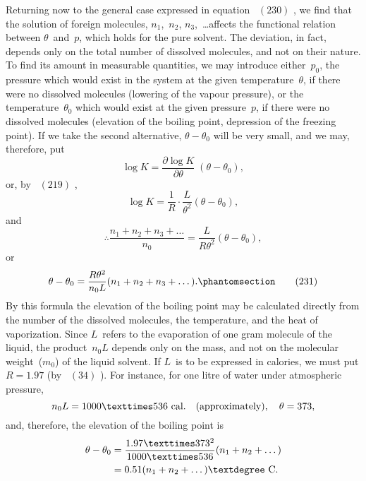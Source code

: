\documentclass[12pt]{book}[2005/09/16]
\newcommand{\Chg}[2]{#2}
\newcommand{\Add}[1]{\Chg{}{#1}}
\newcommand{\Tag}[1]{%
  \phantomsection\label{eqn:#1}\tag*{\ensuremath{#1}}%
}
\newcommand{\Eq}[1]{%
  \hyperref[eqn:#1]{\ensuremath{#1}}%
}
\newcommand{\PageSep}[1]{\ignorespaces}
\newcommand{\dd}{\partial}
\newcommand{\Unit}[1]{\text{\upshape #1}}
\begin{document}
Returning now to the general case expressed in equation~\Eq{(230)},
we find that the solution of foreign molecules,
$n_{1}$,~$n_{2}$, $n_{3}$,~\dots affects the functional relation between $\theta$~and~$p$,
which holds for the pure solvent. The deviation, in fact,
depends only on the total number of dissolved molecules,
and not on their nature. To find its amount in measurable
quantities, we may introduce either~$p_{0}$, the pressure which
would exist in the system at the given temperature~$\theta$, if
there were no dissolved molecules (lowering of the vapour
pressure), or the temperature~$\theta_{0}$ which would exist at the
given pressure~$p$, if there were no dissolved molecules
(elevation of the boiling point, depression of the freezing
point). If we take the second alternative, $\theta - \theta_{0}$ will be
very small, and we may, therefore, put
\[
\log K = \frac{\dd \log K}{\dd \theta}\; (\theta - \theta_{0}),
\]
or, by~\Eq{(219)},
\[
\log K = \frac{1}{R} · \frac{L}{\theta^{2}} (\theta - \theta_{0}),
\]
and
\[
\therefore
\frac{n_{1} + n_{2} + n_{3} + \dots}{n_{0}}
  = \frac{L}{R\theta^{2}} (\theta - \theta_{0}),
\]
or
\[
\theta - \theta_{0} = \frac{R\theta^{2}}{n_{0} L} (n_{1} + n_{2} + n_{3} + \dots)\Add{.}
\Tag{(231)}
\]
By this formula the elevation of the boiling point may
be calculated directly from the number of the dissolved
molecules, the temperature, and the heat of vaporization.
\PageSep{248}
Since $L$~refers to the evaporation of one gram molecule of the
liquid, the product~$n_{0} L$ depends only on the mass, and not
on the molecular weight~($m_{0}$) of the liquid solvent. If $L$~is
to be expressed in calories, we must put $R = 1.97$ (by~\Chg{34}{\Eq{(34)}}).
For instance, for one litre of water under atmospheric
pressure,
\[
n_{0} L = 1000 × 536~\Unit{cal.}\quad\text{(approximately)},\quad
\theta = 373,
\]
and, therefore, the elevation of the boiling point is
\begin{align*}
\theta - \theta_{0}
  &= \frac{1.97 × 373^{2}}{1000 × 536} (n_{1} + n_{2} + \dots) \\
  &= 0.51 (n_{1} + n_{2} + \dots)°~\Unit{C.}
\end{align*}
\end{document}
